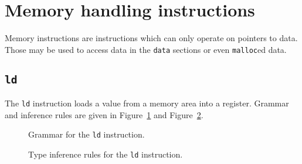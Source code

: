 \section{Memory handling instructions}\label{sec:nstar-instructionset-memory}

Memory instructions are instructions which can only operate on pointers to data.
Those may be used to access data in the \texttt{data} sections or even \texttt{malloc}ed data.

\subsection{\texttt{ld}}\label{subsec:nstar-instructionset-memory-ld}

The \texttt{ld} instruction loads a value from a memory area into a register.
Grammar and inference rules are given in Figure~\ref{fig:nstar-instructionset-memory-ld-grammar} and Figure~\ref{fig:nstar-instructionset-memory-ld-typerules}.

\begin{figure}[H]
  \centering


  \caption{Grammar for the \texttt{ld} instruction.}
  \label{fig:nstar-instructionset-memory-ld-grammar}
\end{figure}

\begin{figure}[H]
  \centering


  \caption{Type inference rules for the \texttt{ld} instruction.}
  \label{fig:nstar-instructionset-memory-ld-typerules}
\end{figure}

